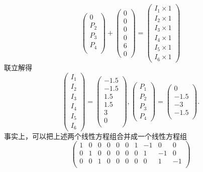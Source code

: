 ﻿\documentclass{book} \usepackage{exsheets} \usepackage{xeCJK}
\begin{document}
\begin{solution}
$$\begin{pmatrix}
  0\\
  P_2\\
  P_3\\
  P_4\\
\end{pmatrix}+
\begin{pmatrix}
  0\\
  0\\
  0\\
  0\\
  6\\
  0
\end{pmatrix}
=
\begin{pmatrix}
  I_1\times 1\\
  I_2\times 1\\
  I_3\times 1\\
  I_4\times 1\\
  I_5\times 1\\
  I_6\times 1
\end{pmatrix}
$$
联立解得
$$
\begin{pmatrix}
  I_1\\
  I_2\\
  I_3\\
  I_4\\
  I_5\\
  I_6
\end{pmatrix}=
\begin{pmatrix}
  -1.5\\
  -1.5\\
  1.5\\
  1.5\\
  3\\
  0\\
\end{pmatrix},
\begin{pmatrix}
  P_1\\
  P_2\\
  P_3\\
  P_4
\end{pmatrix}=
\begin{pmatrix}
  0\\
  -1.5\\
  -3\\
  -1.5\\
\end{pmatrix}.
$$
事实上，可以把上述两个线性方程组合并成一个线性方程组
$$
\begin{pmatrix}
  1&0&0&0&0&0&1&-1&0&0\\
  0&1&0&0&0&0&0&1&-1&0\\
  0&0&1&0&0&0&0&0&1&-1\\

\end{pmatrix}$$
\end{solution}
\end{document}
